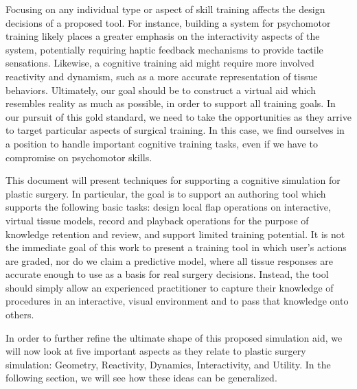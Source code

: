 Focusing on any individual type or aspect of skill training affects
the design decisions of a proposed tool. For instance, building a
system for psychomotor training likely places a greater emphasis on
the interactivity aspects of the system, potentially requiring haptic
feedback mechanisms to provide tactile sensations. Likewise, a
cognitive training aid might require more involved reactivity and
dynamism, such as a more accurate representation of tissue
behaviors. Ultimately, our goal should be to construct a virtual aid
which resembles reality as much as possible, in order to support all
training goals. In our pursuit of this gold standard, we need to take
the opportunities as they arrive to target particular aspects of
surgical training. In this case, we find ourselves in a position to
handle important cognitive training tasks, even if we have to
compromise on psychomotor skills.

This document will present techniques for supporting a cognitive
simulation for plastic surgery. In particular, the goal is to support
an authoring tool which supports the following basic tasks: design
local flap operations on interactive, virtual tissue models, record
and playback operations for the purpose of knowledge retention and
review, and support limited training potential. It is not the
immediate goal of this work to present a training tool in which user's
actions are graded, nor do we claim a predictive model, where all
tissue responses are accurate enough to use as a basis for real
surgery decisions. Instead, the tool should simply allow an
experienced practitioner to capture their knowledge of procedures in
an interactive, visual environment and to pass that knowledge onto
others.

In order to further refine the ultimate shape of this proposed
simulation aid, we will now look at five important aspects as they
relate to plastic surgery simulation: Geometry, Reactivity, Dynamics,
Interactivity, and Utility. In the following section, we will see how
these ideas can be generalized.

